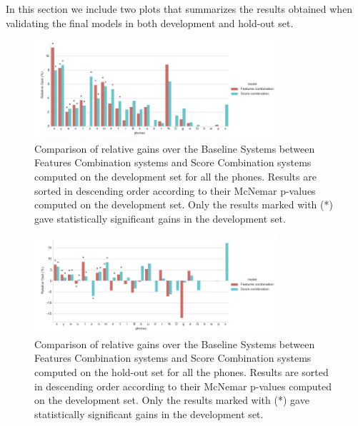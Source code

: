 In this section we include two plots that summarizes the results obtained when validating the final models in both development and hold-out set.

\begin{figure}[H]
	\centering
	\includegraphics[width=0.8\textwidth]{files/figures/results/relatives/relatives-fusion-systems-dev-all.png}
	\caption{Comparison of relative gains over the Baseline Systems
	between Features Combination systems and Score Combination systems
	computed on the development set for all the phones.
	Results are sorted in descending order according to their
	McNemar p-values computed on the development set.
	Only the results marked with (*) gave statistically significant gains in the development set.}
	\label{fig:fusionAllDev}
\end{figure}

\begin{figure}[H]
	\centering
	\includegraphics[width=0.8\textwidth]{files/figures/results/relatives/relative-fusion-systems-heldout-all.png}
	\caption{
		Comparison of relative gains over the Baseline Systems
		between Features Combination systems and Score Combination systems
		computed on the hold-out set for all the phones.
		Results are sorted in descending order according to their
		McNemar p-values computed on the development set.
		Only the results marked with (*) gave statistically significant gains in the development set.
	}
	\label{fig:fusionAllHeldout}
\end{figure}

